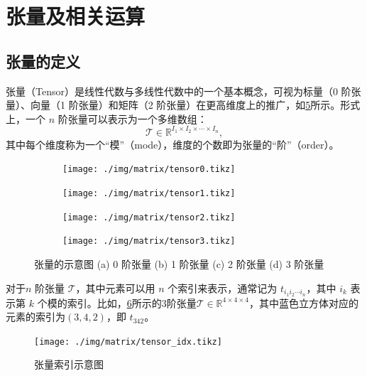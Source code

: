 \maybeNewPage

\section{张量及相关运算}

\subsection{张量的定义}


张量（Tensor）是线性代数与多线性代数中的一个基本概念，可视为标量（0 阶张量）、向量（1 阶张量）和矩阵（2 阶张量）在更高维度上的推广，如\cref{fig_tensor}所示。形式上，一个 $n$ 阶张量可以表示为一个多维数组：
\[
    \mathcal{T} \in \mathbb{R}^{I_1 \times I_2 \times \cdots \times I_n},
\]
其中每个维度称为一个“模”（mode），维度的个数即为张量的“阶”（order）。

\begin{figure}[htb!]
    \centering
    \begin{subfigure}{.1\textwidth}
        \centering
        \texttt{[image: ./img/matrix/tensor0.tikz]}
        \caption{}
        \label{fig_tensor_1}
    \end{subfigure}
    \begin{subfigure}{.23\textwidth}
        \centering
        \texttt{[image: ./img/matrix/tensor1.tikz]}
        \caption{}
        \label{fig_tensor_2}
    \end{subfigure}
    \begin{subfigure}{.23\textwidth}
        \centering
        \texttt{[image: ./img/matrix/tensor2.tikz]}
        \caption{}
        \label{fig_tensor_3}
    \end{subfigure}
    \begin{subfigure}{.23\textwidth}
        \centering
        \texttt{[image: ./img/matrix/tensor3.tikz]}
        \caption{}
        \label{fig_tensor_4}
    \end{subfigure}
    \caption{张量的示意图 (a) 0 阶张量 (b) 1 阶张量 (c) 2 阶张量 (d) 3 阶张量}
    \label{fig_tensor}
\end{figure}

对于$n$ 阶张量 $\mathcal{T}$，其中元素可以用 $n$ 个索引来表示，通常记为 $t_{i_1i_2 \cdots i_n}$，其中 $i_k$ 表示第 $k$ 个模的索引。比如，\cref{fig_tensor_idx}所示的3阶张量\( \mathcal{T} \in \mathbb{R}^{4 \times 4 \times 4} \)，其中蓝色立方体对应的元素的索引为\( (3, 4, 2) \)，即 \( t_{342} \)。

\begin{figure}[htb!]
    \centering
    \texttt{[image: ./img/matrix/tensor\_idx.tikz]}
    \caption{张量索引示意图}
    \label{fig_tensor_idx}
\end{figure}


